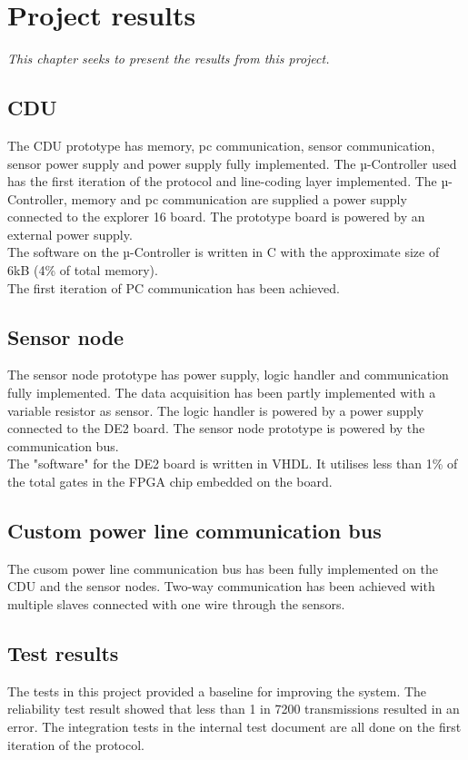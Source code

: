 \chapter{Project results}
\textit{This chapter seeks to present the results from this project.}
\section{CDU}
The CDU prototype has memory, pc communication, sensor communication, sensor power supply and power supply fully implemented. The µ-Controller used has the first iteration of the protocol and line-coding layer implemented. The µ-Controller, memory and pc communication are supplied a power supply connected to the explorer 16 board. The prototype board is powered by an external power supply.\\
The software on the µ-Controller is written in C with the approximate size of 6kB (4\% of total memory).\\
The first iteration of PC communication has been achieved.

\section{Sensor node}
The sensor node prototype has power supply, logic handler and communication fully implemented. The data acquisition has been partly implemented with a variable resistor as sensor. The logic handler is powered by a power supply connected to the DE2 board. The sensor node prototype is powered by the communication bus.\\
The "software" for the DE2 board is written in VHDL. It utilises less than 1\% of the total gates in the FPGA chip embedded on the board.

\section{Custom power line communication bus}
The cusom power line communication bus has been fully implemented on the CDU and the sensor nodes. Two-way communication has been achieved with multiple slaves connected with one wire through the sensors.

\section{Test results}
The tests in this project provided a baseline for improving the system. The reliability test result showed that less than 1 in 7200 transmissions resulted in an error. The integration tests in the internal test document are all done on the first iteration of the protocol. 

